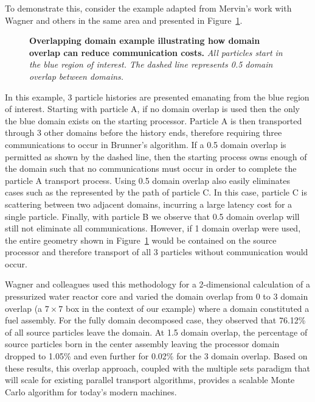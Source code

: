 To demonstrate this, consider the example adapted from Mervin's work
with Wagner and others in the same area \citep{mervin_variance_2012}
and presented in Figure~\ref{fig:msod_example}.
\begin{figure}[htpb!]
  \begin{center}
    \scalebox{1.5}{
       }
  \end{center}
  \caption{\textbf{Overlapping domain example illustrating how domain
      overlap can reduce communication costs.}
    \textit{All particles start in the blue region of interest. The
      dashed line represents 0.5 domain overlap between domains.}}
  \label{fig:msod_example}
\end{figure}
In this example, 3 particle histories are presented emanating from the
blue region of interest. Starting with particle A, if no domain
overlap is used then the only the blue domain exists on the starting
processor. Particle A is then transported through 3 other domains
before the history ends, therefore requiring three communications to
occur in Brunner's algorithm. If a 0.5 domain overlap is permitted as
shown by the dashed line, then the starting process owns enough of the
domain such that no communications must occur in order to complete the
particle A transport process. Using 0.5 domain overlap also easily
eliminates cases such as the represented by the path of particle C. In
this case, particle C is scattering between two adjacent domains,
incurring a large latency cost for a single particle. Finally, with
particle B we observe that 0.5 domain overlap will still not eliminate
all communications. However, if 1 domain overlap were used, the entire
geometry shown in Figure~\ref{fig:msod_example} would be contained on
the source processor and therefore transport of all 3 particles
without communication would occur.

Wagner and colleagues used this methodology for a 2-dimensional
calculation of a pressurized water reactor core and varied the domain
overlap from 0 to 3 domain overlap (a $7 \times 7$ box in the context
of our example) where a domain constituted a fuel assembly. For the
fully domain decomposed case, they observed that 76.12\% of all source
particles leave the domain. At 1.5 domain overlap, the percentage of
source particles born in the center assembly leaving the processor
domain dropped to 1.05\% and even further for 0.02\% for the 3 domain
overlap. Based on these results, this overlap approach, coupled with
the multiple sets paradigm that will scale for existing parallel
transport algorithms, provides a scalable Monte Carlo algorithm for
today's modern machines.

